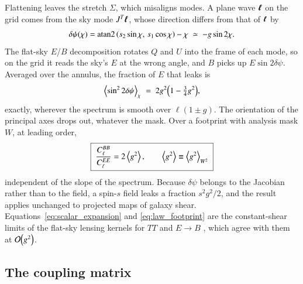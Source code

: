 \documentclass{aa}
\DeclareMathOperator{\atantwo}{atan2}
\newcommand{\vbell}{\vb*{\ell}}
\newcommand{\gsq}{\expval{g^2}}
\begin{document}
Flattening leaves the stretch $\Sigma$, which misaligns modes.
A plane wave $\vbell$ on the grid comes from the sky mode $J^{T}\vbell$, whose direction differs from that of $\vbell$ by
\begin{equation}
  \delta\psi(\chi) = \atantwo\qty(s_2 \sin\chi,\, s_1 \cos\chi) - \chi
  \;\simeq\; -g \sin 2\chi.
\end{equation}
The flat-sky $E$/$B$ decomposition rotates $Q$ and $U$ into the frame of each mode, so on the grid it reads the sky's $E$ at the wrong angle, and $B$ picks up $E\sin 2\delta\psi$.
Averaged over the annulus, the fraction of $E$ that leaks is
\begin{equation} \label{eq:law}
  \expval{\sin^2 2\delta\psi}_\chi \;=\; 2 g^2 \qty(1 - \tfrac{3}{4} g^2),
\end{equation}
exactly, wherever the spectrum is smooth over $\ell(1 \pm g)$.
The orientation of the principal axes drops out, whatever the mask.
Over a footprint with analysis mask $W$, at leading order,
\begin{equation} \label{eq:law_footprint}
  \boxed{\;\frac{C_\ell^{BB}}{C_\ell^{EE}} = 2 \gsq, \qquad \gsq \equiv \expval{g^2}_{W^2}\;}
\end{equation}
independent of the slope of the spectrum.
Because $\delta\psi$ belongs to the Jacobian rather than to the field, a spin-$s$ field leaks a fraction $s^2 g^2/2$, and the result applies unchanged to projected maps of galaxy shear.
Equations~\eqref{eq:scalar_expansion} and \eqref{eq:law_footprint} are the constant-shear limits of the flat-sky lensing kernels for $TT$ and $E \to B$ \citep{lewis06}, which agree with them at $\order{g^2}$.

\subsection{The coupling matrix} \label{subsec:footprint}
\end{document}
